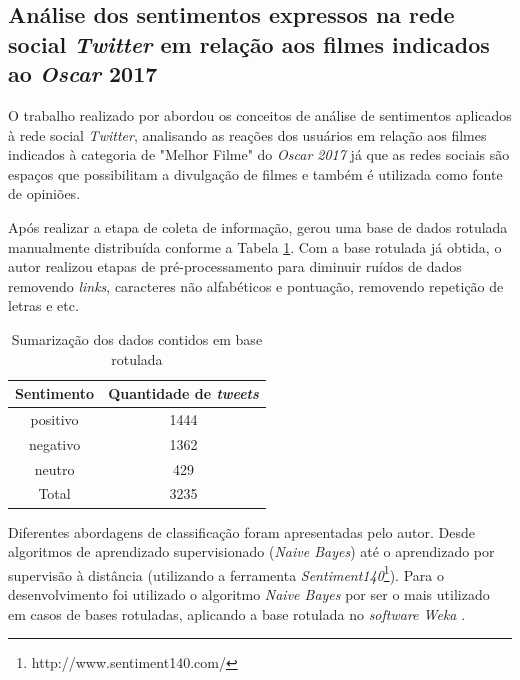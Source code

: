 \subsection{Análise dos sentimentos expressos na rede social \textit{Twitter} em relação aos filmes indicados ao \textit{Oscar} 2017}

O trabalho realizado por  abordou os conceitos de análise de sentimentos aplicados à rede social \textit{Twitter}, analisando as reações dos usuários em relação aos filmes indicados à categoria de "Melhor Filme" do \textit{Oscar 2017} já que as redes sociais são espaços que possibilitam a divulgação de filmes e também é utilizada como fonte de opiniões. 

Após realizar a etapa de coleta de informação,  gerou uma base de dados rotulada manualmente distribuída conforme a Tabela \ref{tab:sumarizacaocorrea}. Com a base rotulada já obtida, o autor realizou etapas de pré-processamento para diminuir ruídos de dados removendo \textit{links}, caracteres não alfabéticos e pontuação, removendo repetição de letras e etc.

\begin{table}[h!]
  \begin{center}
    \caption{Sumarização dos dados contidos em base rotulada}
    \label{tab:sumarizacaocorrea}
    
    \begin{tabular}{cc} %
      \textbf{Sentimento} & \textbf{Quantidade de \textit{tweets}}\\
      \hline
       positivo&1444\\
       negativo&1362\\
       neutro&429\\
      \hline
      Total&3235
    \end{tabular}
  \end{center}
\end{table}


Diferentes abordagens de classificação foram apresentadas pelo autor. Desde algoritmos de aprendizado supervisionado (\textit{Naive Bayes}) até o aprendizado por supervisão à distância (utilizando a ferramenta \textit{Sentiment140}\footnote{http://www.sentiment140.com/}). Para o desenvolvimento foi utilizado o algoritmo \textit{Naive Bayes} por ser o mais utilizado em casos de bases rotuladas, aplicando a base rotulada no \textit{software Weka} \cite{Correa2017}. 

